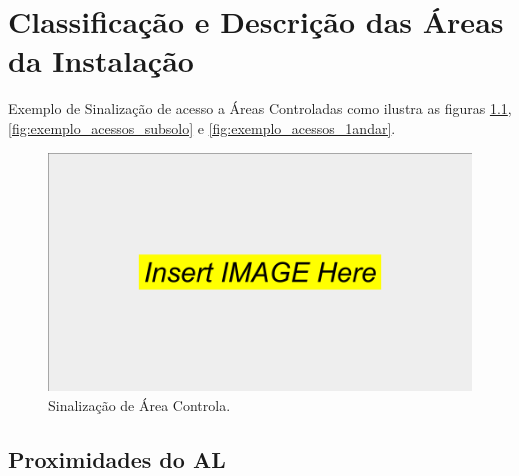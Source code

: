 \chapter{Classificação e Descrição das Áreas da Instalação}
\label{ch:classificao_descricao_area}

Exemplo de Sinalização de acesso a Áreas Controladas como ilustra as figuras \ref{fig:trifolio}, \ref{fig:exemplo_acessos_subsolo} e \ref{fig:exemplo_acessos_1andar}.

\begin{figure}[!h]
    \centering
    \includegraphics[width=0.5\linewidth]{anexos//imagens//Classificação de Áreas/trifolio.png}
    \caption{Sinalização de Área Controla.}
    \label{fig:trifolio}
\end{figure}

\section{Proximidades do AL}
\label{sec:proximidades_6ex}
